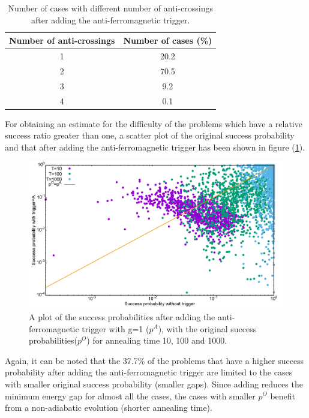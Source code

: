 \documentclass[12]{article}
\begin{document}
\begin{table}[H]
\centering
\renewcommand{\arraystretch}{1.5}
\begin{tabular}{|c|c|}
\hline 
Number of anti-crossings & Number of cases (\%) \\ 
\hline 
1 & 20.2 \\ 
\hline 
2 & 70.5 \\ 
\hline 
3 & 9.2 \\ 
\hline 
4 & 0.1 \\ 
\hline 
\end{tabular} 
\caption{Number of cases with different number of anti-crossings after adding the anti-ferromagnetic trigger.}
\label{tab:a4}

\end{table}
For obtaining an estimate for the difficulty of the problems which have a relative success ratio greater than one, a scatter plot of the original success probability and that after adding the anti-ferromagnetic trigger has been shown in figure (\ref{fig:a22}).


\begin{figure}[H]
\centering 
\includegraphics[scale=0.3]{ProbScat_g1.png}
\caption{A plot of the success probabilities after adding the anti-ferromagnetic trigger with g=1 ($p^A$), with the original success probabilities($p^O$) for annealing time 10, 100 and 1000.}
\label{fig:a22}
\end{figure}

Again, it can be noted that the 37.7\% of the problems that have a higher success probability after adding the anti-ferromagnetic trigger are limited to the cases with smaller original success probability (smaller gaps). Since adding reduces the minimum energy gap for almost all the cases, the cases with smaller $p^O$ benefit from a non-adiabatic evolution (shorter annealing time).\\
\end{document}
